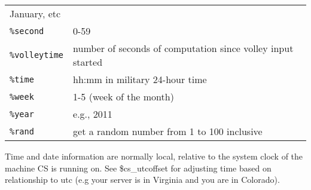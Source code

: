 \documentclass[]{article}
\begin{document}
\begin{longtable}[]{@{}ll@{}}
\begin{minipage}[t]{0.61\columnwidth}
January, etc\strut
\end{minipage}\tabularnewline
\begin{minipage}[t]{0.12\columnwidth}\raggedright\strut
\texttt{\%second}\strut
\end{minipage} & \begin{minipage}[t]{0.61\columnwidth}\raggedright\strut
0-59\strut
\end{minipage}\tabularnewline
\begin{minipage}[t]{0.12\columnwidth}\raggedright\strut
\texttt{\%volleytime}\strut
\end{minipage} & \begin{minipage}[t]{0.61\columnwidth}\raggedright\strut
number of seconds of computation since volley input started\strut
\end{minipage}\tabularnewline
\begin{minipage}[t]{0.12\columnwidth}\raggedright\strut
\texttt{\%time}\strut
\end{minipage} & \begin{minipage}[t]{0.61\columnwidth}\raggedright\strut
hh:mm in military 24-hour time\strut
\end{minipage}\tabularnewline
\begin{minipage}[t]{0.12\columnwidth}\raggedright\strut
\texttt{\%week}\strut
\end{minipage} & \begin{minipage}[t]{0.61\columnwidth}\raggedright\strut
1-5 (week of the month)\strut
\end{minipage}\tabularnewline
\begin{minipage}[t]{0.12\columnwidth}\raggedright\strut
\texttt{\%year}\strut
\end{minipage} & \begin{minipage}[t]{0.61\columnwidth}\raggedright\strut
e.g., 2011\strut
\end{minipage}\tabularnewline
\begin{minipage}[t]{0.12\columnwidth}\raggedright\strut
\texttt{\%rand}\strut
\end{minipage} & \begin{minipage}[t]{0.61\columnwidth}\raggedright\strut
get a random number from 1 to 100 inclusive\strut
\end{minipage}\tabularnewline
\bottomrule
\end{longtable}

Time and date information are normally local, relative to the system
clock of the machine CS is running on. See \$cs\_utcoffset for adjusting
time based on relationship to utc (e.g your server is in Virginia and
you are in Colorado).
\end{document}

